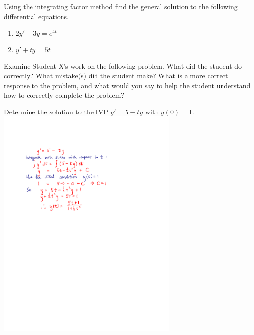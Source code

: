 \documentclass[12pt,letterpaper]{hmcpset}
\begin{document}
\begin{solution}
  \vfill
\end{solution}
\newpage

\begin{problem}[4]
Using the integrating factor method find the general solution to the following differential equations.
\begin{enumerate}
	\item $2y' + 3y = e^{4t}$
	\item $y' + ty = 5t$
\end{enumerate}
\end{problem}

\begin{solution}
  \vfill
\end{solution}
\newpage

\begin{problem}[5]
	Examine Student X's work on the following problem.  What did the student do correctly?  What mistake(s) did the student make?  What is a more correct response to the problem, and what would you say to help the student understand how to correctly complete the problem?
	
	\begin{center}
		\parbox[c]{5.5in}{Determine the solution to the IVP $y'=5-ty$ with $y(0)=1$.\\
				
		\centering\includegraphics[width=3.5in,keepaspectratio=true]{img/mar_22_5}}
	\end{center}
\end{problem}
\end{document}

